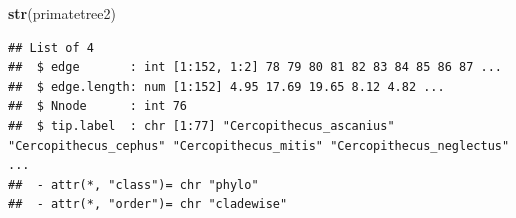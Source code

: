 \documentclass[]{article}
\newenvironment{Shaded}{\begin{snugshade}}{\end{snugshade}}
\newcommand{\KeywordTok}[1]{\textcolor[rgb]{0.13,0.29,0.53}{\textbf{{#1}}}}
\newcommand{\NormalTok}[1]{{#1}}
\begin{document}
\begin{Shaded}
\begin{Highlighting}[]
\KeywordTok{str}\NormalTok{(primatetree2)}
\end{Highlighting}
\end{Shaded}

\begin{verbatim}
## List of 4
##  $ edge       : int [1:152, 1:2] 78 79 80 81 82 83 84 85 86 87 ...
##  $ edge.length: num [1:152] 4.95 17.69 19.65 8.12 4.82 ...
##  $ Nnode      : int 76
##  $ tip.label  : chr [1:77] "Cercopithecus_ascanius" "Cercopithecus_cephus" "Cercopithecus_mitis" "Cercopithecus_neglectus" ...
##  - attr(*, "class")= chr "phylo"
##  - attr(*, "order")= chr "cladewise"
\end{verbatim}
\end{document}
